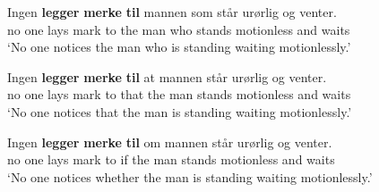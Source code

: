 \documentclass[output=paper]{langsci/langscibook}
\begin{document}
\ea \label{dyv:ex:mweiness:leggemerketil-a}
\gll Ingen \textbf{legger} \textbf{merke} \textbf{til} mannen som står urørlig og venter. \\ %
     {no one} lays mark to {the man} who stands motionless and waits \\ %
\glt `No one notices the man who is standing waiting motionlessly.' %
\z

\ea \label{dyv:ex:mweiness:leggemerketil-b}
\gll Ingen \textbf{legger} \textbf{merke} \textbf{til} at mannen står urørlig og venter. \\ %
     {no one} lays mark to that {the man} stands motionless and waits \\ %
\glt `No one notices that the man is standing waiting motionlessly.' %
\z

\ea \label{dyv:ex:mweiness:leggemerketil-c}
\gll Ingen \textbf{legger} \textbf{merke} \textbf{til} om mannen står urørlig og venter. \\ %
     {no one} lays mark to if {the man} stands motionless and waits \\ %
\glt `No one notices whether the man is standing waiting motionlessly.' %
\z

\end{document}
